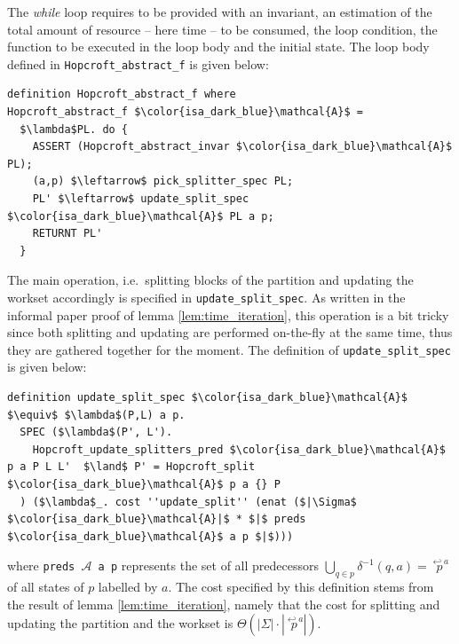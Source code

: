\documentclass[12pt, a4 paper]{article}
\newcommand{\edmargin}[2]{\marginpar{\raggedright\linespread{.7}\tiny #1: #2}}
\theoremstyle{definition}
\begin{document}
The \textit{while} loop requires to be provided with an invariant, an estimation\edmargin{VT}{To be detailed} of the total amount of resource -- here time -- to be consumed, the loop condition, the function to be executed in the loop body and the initial state.
The loop body defined in \texttt{Hopcroft\_abstract\_f} is given below:
\begin{lstlisting}[language=Isabelle]
definition Hopcroft_abstract_f where
Hopcroft_abstract_f $\color{isa_dark_blue}\mathcal{A}$ = 
  $\lambda$PL. do {
    ASSERT (Hopcroft_abstract_invar $\color{isa_dark_blue}\mathcal{A}$ PL);                             
    (a,p) $\leftarrow$ pick_splitter_spec PL;
    PL' $\leftarrow$ update_split_spec $\color{isa_dark_blue}\mathcal{A}$ PL a p;
    RETURNT PL'
  }
\end{lstlisting}
The main operation, i.e.\ splitting blocks of the partition and updating the workset accordingly is specified in \texttt{update\_split\_spec}.
As written in the informal paper proof of lemma \ref{lem:time_iteration}, this operation is a bit tricky since both splitting and updating are performed on-the-fly at the same time, thus they are gathered together for the moment.
The definition of \texttt{update\_split\_spec} is given below:
\begin{lstlisting}[language=Isabelle]
definition update_split_spec $\color{isa_dark_blue}\mathcal{A}$ $\equiv$ $\lambda$(P,L) a p.
  SPEC ($\lambda$(P', L').
    Hopcroft_update_splitters_pred $\color{isa_dark_blue}\mathcal{A}$ p a P L L'  $\land$ P' = Hopcroft_split $\color{isa_dark_blue}\mathcal{A}$ p a {} P
  ) ($\lambda$_. cost ''update_split'' (enat ($|\Sigma$ $\color{isa_dark_blue}\mathcal{A}|$ * $|$ preds $\color{isa_dark_blue}\mathcal{A}$ a p $|$)))
\end{lstlisting}
where \texttt{preds $\mathcal{A}$ a p} represents the set of all predecessors $\bigcup_{q \in p} \delta^{-1}(q, a) = \overset{\hookleftarrow a}{p}$ of all states of $p$ labelled by $a$. The cost specified by this definition stems from the result of lemma \ref{lem:time_iteration}, namely that the cost for splitting and updating the partition and the workset is $\Theta(|\Sigma| \cdot |\overset{\hookleftarrow a}{p}|)$.



% 

\pagebreak


\end{document}
